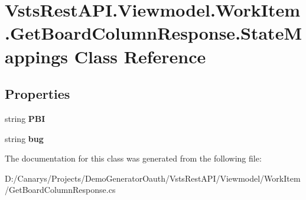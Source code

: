 \hypertarget{class_vsts_rest_a_p_i_1_1_viewmodel_1_1_work_item_1_1_get_board_column_response_1_1_state_mappings}{}\section{Vsts\+Rest\+A\+P\+I.\+Viewmodel.\+Work\+Item.\+Get\+Board\+Column\+Response.\+State\+Mappings Class Reference}
\label{class_vsts_rest_a_p_i_1_1_viewmodel_1_1_work_item_1_1_get_board_column_response_1_1_state_mappings}
\subsection*{Properties}
\begin{DoxyCompactItemize}
\item 
\mbox{\label{class_vsts_rest_a_p_i_1_1_viewmodel_1_1_work_item_1_1_get_board_column_response_1_1_state_mappings_ad63a3440ac5c2962722f72f0cb150aed}} 
string {\bfseries P\+BI}
\item 
\mbox{\label{class_vsts_rest_a_p_i_1_1_viewmodel_1_1_work_item_1_1_get_board_column_response_1_1_state_mappings_ab96c2cc0d1407b8063b9c75c23d2e64a}} 
string {\bfseries bug}
\end{DoxyCompactItemize}


The documentation for this class was generated from the following file\+:\begin{DoxyCompactItemize}
\item 
D\+:/\+Canarys/\+Projects/\+Demo\+Generator\+Oauth/\+Vsts\+Rest\+A\+P\+I/\+Viewmodel/\+Work\+Item/Get\+Board\+Column\+Response.\+cs\end{DoxyCompactItemize}

